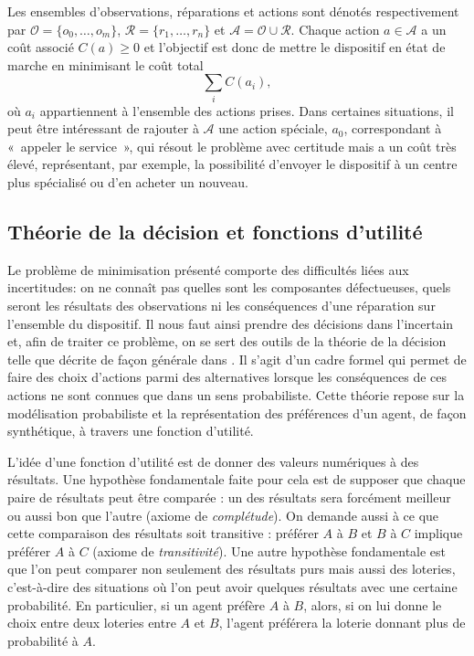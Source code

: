 \documentclass[a4paper,11pt]{article}
\theoremstyle{plain}
\theoremstyle{definition}
\begin{document}
Les ensembles d'observations, réparations et actions sont dénotés respectivement par $\mathcal O = \{ o_0, \dotsc, o_m\}$, $\mathcal R = \{r_1, \dotsc, r_n\}$ et $\mathcal A = \mathcal O \cup \mathcal R$. Chaque action $a \in \mathcal A$ a un coût associé $C(a) \geq 0$ et l'objectif est donc de mettre le dispositif en état de marche en minimisant le coût total \[\sum_i C(a_i),\] où $a_i$ appartiennent à l'ensemble des actions prises. Dans certaines situations, il peut être intéressant de rajouter à $\mathcal A$ une action spéciale, $a_0$, correspondant à «~appeler le service~», qui résout le problème avec certitude mais a un coût très élevé, représentant, par exemple, la possibilité d'envoyer le dispositif à un centre plus spécialisé ou d'en acheter un nouveau.

\subsection{Théorie de la décision et fonctions d'utilité}


Le problème de minimisation présenté comporte des difficultés liées aux incertitudes: on ne connaît pas quelles sont les composantes défectueuses, quels seront les résultats des observations ni les conséquences d'une réparation sur l'ensemble du dispositif. Il nous faut ainsi prendre des décisions dans l'incertain et, afin de traiter ce problème, on se sert des outils de la théorie de la décision telle que décrite de façon générale dans \cite{North_1968}. Il s'agit d'un cadre formel qui permet de faire des choix d'actions parmi des alternatives lorsque les conséquences de ces actions ne sont connues que dans un sens probabiliste. Cette théorie repose sur la modélisation probabiliste et la représentation des préférences d'un agent, de façon synthétique, à travers une fonction d'utilité. 

L'idée d'une fonction d'utilité est de donner des valeurs numériques à des résultats. Une hypothèse fondamentale faite pour cela est de supposer que chaque paire de résultats peut être comparée : un des résultats sera forcément meilleur ou aussi bon que l'autre (axiome de \emph{complétude}). On demande aussi à ce que cette comparaison des résultats soit transitive : préférer $A$ à $B$ et $B$ à $C$ implique préférer $A$ à $C$ (axiome de \emph{transitivité}).
Une autre hypothèse fondamentale est que l'on peut comparer non seulement des résultats purs mais aussi des loteries, c'est-à-dire des situations où l'on peut avoir quelques résultats avec une certaine probabilité. En particulier, si un agent préfère $A$ à $B$, alors, si on lui donne le choix entre deux loteries entre $A$ et $B$, l'agent préférera la loterie donnant plus de probabilité à $A$. 
\end{document}

